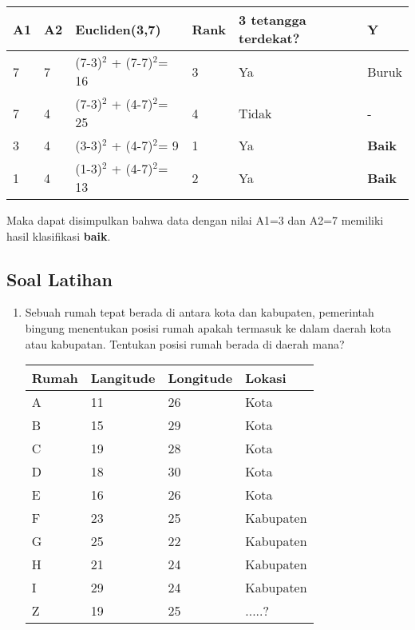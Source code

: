 \begin{enumerate}
\begin{table}[!ht]
\begin{tabular}{|l|l|l|l|l|l|}
\hline
A1 & A2 & Eucliden(3,7)               & Rank & 3 tetangga terdekat? & Y             \\ \hline
7  & 7  & (7-3)$^{2}$ + (7-7)$^{2}$= 16 & 3    & Ya                   & Buruk         \\ \hline
7  & 4  & (7-3)$^{2}$ + (4-7)$^{2}$= 25 & 4    & Tidak                & -             \\ \hline
3  & 4  & (3-3)$^{2}$ + (4-7)$^{2}$= 9  & 1    & Ya                   & \textbf{Baik} \\ \hline
1  & 4  & (1-3)$^{2}$ + (4-7)$^{2}$= 13 & 2    & Ya                   & \textbf{Baik} \\ \hline
\end{tabular}
\end{table}
\end{enumerate}
Maka dapat disimpulkan bahwa data dengan nilai A1=3 dan A2=7 memiliki hasil klasifikasi \textbf{baik}.

\subsection{Soal Latihan}
\begin{enumerate}
    \item Sebuah rumah tepat berada di antara kota dan kabupaten, pemerintah bingung menentukan posisi rumah apakah termasuk ke dalam daerah kota atau kabupatan. Tentukan posisi rumah berada di daerah mana?
    \begin{table}[!htpb]
    \centering
\begin{tabular}{|l|l|l|l|}
\hline
Rumah & Langitude & Longitude & Lokasi    \\ \hline
A     & 11        & 26        & Kota      \\ \hline
B     & 15        & 29        & Kota      \\ \hline
C     & 19        & 28        & Kota      \\ \hline
D     & 18        & 30        & Kota      \\ \hline
E     & 16        & 26        & Kota      \\ \hline
F     & 23        & 25        & Kabupaten \\ \hline
G     & 25        & 22        & Kabupaten \\ \hline
H     & 21        & 24        & Kabupaten \\ \hline
I     & 29        & 24        & Kabupaten \\ \hline
Z     & 19        & 25        & .....?    \\ \hline
\end{tabular}
\end{table}
\end{enumerate}
\pagebreak
